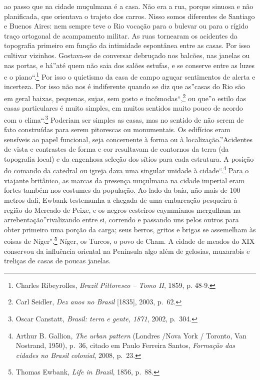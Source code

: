 ao passo que na cidade muçulmana é a casa. Não era a rua, porque sinuosa
e não planificada, que orientava o trajeto dos carros. Nisso somos
diferentes de Santiago e Buenos Aires: nem sempre teve o Rio vocação
para o bulevar ou para o rígido traço ortogonal de acampamento militar.
As ruas tornearam os acidentes da topografia primeiro em função da
intimidade espontânea entre as casas. Por isso cultivar vizinhos.
Gostava-se de conversar debruçado nos balcões, nas janelas ou nas
portas, e há''até quem não saia dos salões estufas, e se conserve entre
as luzes e o piano``.\footnote{Charles Ribeyrolles, \emph{Brazil
  Pittoresco -- Tomo II}, 1859, p. 48-9.} Por isso o quietismo da casa
de campo aguçar sentimentos de alerta e incerteza. Por isso não nos é
indiferente quando se diz que as''casas do Rio são em geral baixas,
pequenas, sujas, sem gosto e incômodas``,\footnote{Carl Seidler,
  \emph{Dez anos no Brasil} {[}1835{]}, 2003, p.~62.} ou que''o estilo
das casas particulares é muito simples, em muitos sentidos muito pouco
de acordo com o clima``.\footnote{Oscar Canstatt, \emph{Brasil: terra e
  gente, 1871}, 2002, p.~304.} Poderiam ser simples as casas, mas no
sentido de não serem de fato construídas para serem pitorescas ou
monumentais. Os edifícios eram sensíveis ao papel funcional, seja
concernente à forma ou à localização.''Acidentes de vista e contrastes
de forma e cor resultavam de contornos da terra (da topografia local) e
da engenhosa seleção dos sítios para cada estrutura. A posição do
comando da catedral ou igreja dava uma singular unidade à
cidade``.\footnote{Arthur B. Gallion, \emph{The urban pattern} (Londres
  /Nova York / Toronto, Van Nostrand, 1950), p.~36, citado em Paulo
  Ferreira Santos, \emph{Formação das cidades no Brasil colonial}, 2008,
  p.~23.} Para o viajante britânico, as marcas da presença muçulmana na
cidade imperial eram fortes também nos costumes da população. Ao lado da
baía, não mais de 100 metros dali, Ewbank testemunha a chegada de uma
embarcação pesqueira à região do Mercado de Peixe, e os negros cesteiros
caymmianos mergulham na arrebentação''rivalizando entre si, correndo e
passando uns pelos outros para obter primeiro uma porção da carga; seus
berros, gritos e brigas se assemelham às coisas de Níger".\footnote{Thomas
  Ewbank, \emph{Life in Brazil}, 1856, p.~88.} Níger, os Turcos, o povo
de Cham. A cidade de meados do XIX conservou da influência oriental na
Península algo além de gelosias, muxarabis e treliças de casas de poucas
janelas.

